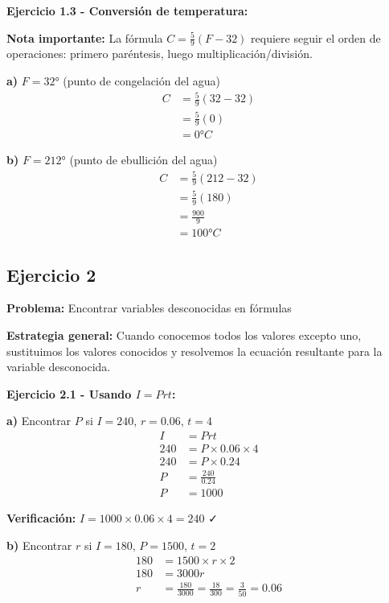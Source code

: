 \textbf{Ejercicio 1.3 - Conversión de temperatura:}

\textbf{Nota importante:} La fórmula $C = \frac{5}{9}(F-32)$ requiere seguir el orden de operaciones: primero paréntesis, luego multiplicación/división.

\textbf{a)} $F = 32°$ (punto de congelación del agua)
\begin{align}
C &= \frac{5}{9}(32-32)\\
&= \frac{5}{9}(0)\\
&= 0°C
\end{align}

\textbf{b)} $F = 212°$ (punto de ebullición del agua)
\begin{align}
C &= \frac{5}{9}(212-32)\\
&= \frac{5}{9}(180)\\
&= \frac{900}{9}\\
&= 100°C
\end{align}

\subsection*{Ejercicio 2}

\textbf{Problema:} Encontrar variables desconocidas en fórmulas

\textbf{Estrategia general:} Cuando conocemos todos los valores excepto uno, sustituimos los valores conocidos y resolvemos la ecuación resultante para la variable desconocida.

\textbf{Ejercicio 2.1 - Usando $I = Prt$:}

\textbf{a)} Encontrar $P$ si $I = 240$, $r = 0.06$, $t = 4$
\begin{align}
I &= Prt\\
240 &= P \times 0.06 \times 4\\
240 &= P \times 0.24\\
P &= \frac{240}{0.24}\\
P &= 1000
\end{align}

\textbf{Verificación:} $I = 1000 \times 0.06 \times 4 = 240$ ✓

\textbf{b)} Encontrar $r$ si $I = 180$, $P = 1500$, $t = 2$
\begin{align}
180 &= 1500 \times r \times 2\\
180 &= 3000r\\
r &= \frac{180}{3000} = \frac{18}{300} = \frac{3}{50} = 0.06
\end{align}

